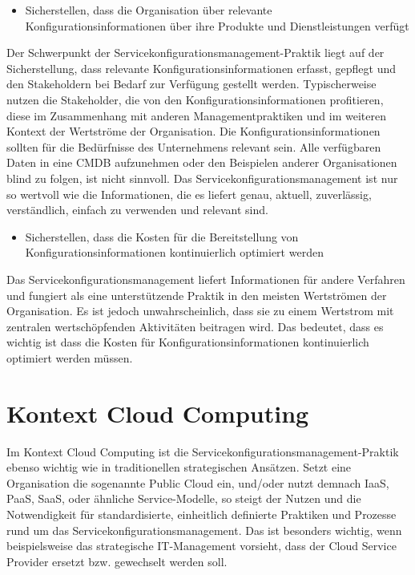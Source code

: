 \begin{itemize}
	\item Sicherstellen, dass die Organisation über relevante Konfigurationsinformationen über ihre Produkte und Dienstleistungen verfügt
\end{itemize}

\noindent
Der Schwerpunkt der Servicekonfigurationsmanagement-Praktik liegt auf der Sicherstellung, dass relevante Konfigurationsinformationen
erfasst, gepflegt und den Stakeholdern bei Bedarf zur Verfügung gestellt werden.
Typischerweise nutzen die Stakeholder, die von den Konfigurationsinformationen profitieren, diese im Zusammenhang mit anderen
Managementpraktiken und im weiteren Kontext der Wertströme der Organisation.
Die Konfigurationsinformationen sollten für die Bedürfnisse des Unternehmens relevant sein. Alle verfügbaren
Daten in eine CMDB aufzunehmen oder den Beispielen anderer Organisationen blind zu folgen, ist nicht sinnvoll. Das
Servicekonfigurationsmanagement ist nur so wertvoll wie die Informationen, die es liefert
genau, aktuell, zuverlässig, verständlich, einfach zu verwenden und relevant sind.

\begin{itemize}
	\item Sicherstellen, dass die Kosten für die Bereitstellung von Konfigurationsinformationen kontinuierlich optimiert werden
\end{itemize}

\noindent
Das Servicekonfigurationsmanagement liefert Informationen für andere Verfahren und fungiert als
eine unterstützende Praktik in den meisten Wertströmen der Organisation. Es ist jedoch unwahrscheinlich, dass sie
zu einem Wertstrom mit zentralen wertschöpfenden Aktivitäten beitragen wird. Das bedeutet, dass es wichtig ist
dass die Kosten für Konfigurationsinformationen kontinuierlich optimiert werden müssen.

\section{Kontext Cloud Computing}
Im Kontext Cloud Computing ist die Servicekonfigurationsmanagement-Praktik
ebenso wichtig wie in traditionellen strategischen Ansätzen.
Setzt eine Organisation die sogenannte Public Cloud ein, und/oder nutzt
demnach IaaS, PaaS, SaaS, oder ähnliche Service-Modelle, so steigt
der Nutzen und die Notwendigkeit für standardisierte, einheitlich definierte
Praktiken und Prozesse rund um das Servicekonfigurationsmanagement. 
Das ist besonders wichtig, wenn beispielsweise das strategische IT-Management
vorsieht, dass der Cloud Service Provider ersetzt bzw. gewechselt werden soll.

